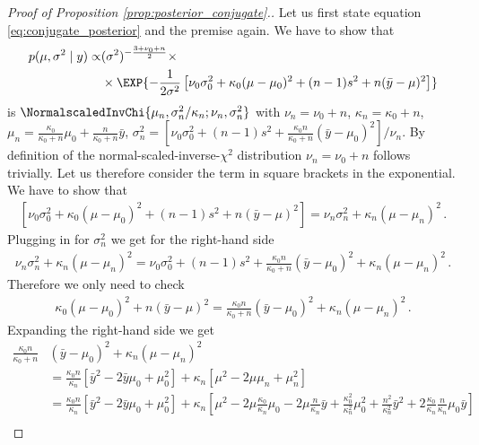 \begin{proof}[Proof of Proposition \ref{prop:posterior_conjugate}.]
Let us first state equation \ref{eq:conjugate_posterior} and the premise again.
We have to show that
\begin{align*}
  p(\mu, \sigma^2 \mid y) \propto& (\sigma^2)^{-\frac{3 + \nu_0 + n}{2}} \times\\
  & \times \EXP{-\frac{1}{2 \sigma^2} \left[\nu_0\sigma_0^2 + \kappa_0(\mu - \mu_0)^2 + (n-1)s^2 + n(\bar{y} - \mu)^2 \right]}
\end{align*}
is $\NormalscaledInvChi{\mu_n, \sigma_n^2/\kappa_n; \nu_n, \sigma_n^2}$ with $\nu_n = \nu_0 + n$, $\kappa_n = \kappa_0 + n$, $\mu_n =\frac{\kappa_0}{\kappa_0 + n}\mu_0 + \frac{n}{\kappa_0 + n}\bar{y}$, $\sigma_n^2 = \left[\nu_0 \sigma_0^2 + (n-1)s^2 + \frac{\kappa_0 n}{\kappa_0 + n} (\bar{y} - \mu_0)^2\right] /\nu_n$.
By definition of the normal-scaled-inverse-$\chi^2$ distribution $\nu_n = \nu_0 + n$ follows trivially.
Let us therefore consider the term in square brackets in the exponential.
We have to show that
\begin{align*}
  \left[\nu_0\sigma_0^2 + \kappa_0(\mu - \mu_0)^2 + (n-1)s^2 + n(\bar{y} - \mu)^2 \right] = \nu_n \sigma_n^2 + \kappa_n (\mu - \mu_n)^2 \,.
\end{align*}
Plugging in for $\sigma_n^2$ we get for the right-hand side
\begin{align*}
  \nu_n \sigma_n^2 + \kappa_n (\mu - \mu_n)^2 = \nu_0 \sigma_0^2 + (n-1)s^2 + \frac{\kappa_0 n}{\kappa_0 + n} (\bar{y} - \mu_0)^2 + \kappa_n (\mu- \mu_n)^2 \,.
\end{align*}
Therefore we only need to check
\begin{align*}
  \kappa_0(\mu - \mu_0)^2 + n(\bar{y} - \mu)^2 = \frac{\kappa_0 n}{\kappa_0 + n} (\bar{y} - \mu_0)^2 + \kappa_n (\mu- \mu_n)^2 \,.
\end{align*}
Expanding the right-hand side we get
\begin{align*}
\frac{\kappa_0 n}{\kappa_0 + n} &(\bar{y} - \mu_0)^2 + \kappa_n (\mu- \mu_n)^2\\
&=\frac{\kappa_0 n}{\kappa_n}\left[\bar{y}^2 - 2\bar{y}\mu_0 + \mu_0^2 \right] + \kappa_n \left[\mu^2 - 2\mu\mu_n + \mu_n^2 \right]\\
&=\frac{\kappa_0 n}{\kappa_n}\left[\bar{y}^2 - 2\bar{y}\mu_0 + \mu_0^2 \right] + \kappa_n \left[\mu^2 - 2\mu\frac{\kappa_0}{\kappa_n}\mu_0 - 2\mu\frac{n}{\kappa_n}\bar{y} + \frac{\kappa_0^2}{\kappa_n^2}\mu_0^2 + \frac{n^2}{\kappa_n^2} \bar{y}^2 + 2\frac{\kappa_0}{\kappa_n} \frac{n}{\kappa_n}\mu_0\bar{y} \right]\\

\end{align*}
\end{proof}
